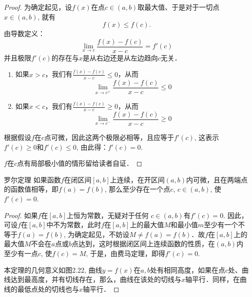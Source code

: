 \begin{proof}
    为确定起见，设$f(x)$在点$c\in (a,b)$取最大值、于是对于一切点$x\in (a,b)$, 就有
\[
f (x) \le f (c). 
\]
由导数定义：
\[\lim_{x\to c}\frac{f (x) -f (c)}{x-c} =f' (c) \]
并且极限$f'(c)$的存在与$x$是从右边还是从左边趋向$c$无关．

\begin{enumerate}
    \item 如果$x>c$，我们有$\frac{f (x) -f (c)}{x-c}\le 0$，从而
\[\lim_{x\to c^+}\frac{f (x) -f (c)}{x-c}\le 0\]
\item 如果$x<c$，我们有$\frac{f (x) -f (c)}{x-c}\ge 0$，从而
\[\lim_{x\to c^-}\frac{f (x) -f (c)}{x-c}\ge 0\]
\end{enumerate}
根据假设$f$在$c$点可微，因此这两个极限必相等，且应等于$f'(c)$, 这表示$f'(c)\ge 0$和$f'(c)\le 0$, 由此得：$f' (c) =0$.

$f$在$c$点有局部极小值的情形留给读者自证．
\end{proof}

\begin{blk}
  {罗尔定理} 如果函数$f$在闭区间$[a,b]$上连续，在开区间$(a,b)$内可微，且在两端点的函数值相等，即$f(a)=f(b)$, 那么至少存在一个点$c$, $c\in (a,b)$, 使$f'(c)=0$.  
\end{blk}

\begin{proof}
如果$f$在$[a,b]$上恒为常数，无疑对于任何
$c\in (a,b)$有$f'(c)=0$. 因此，可设$f$在$[a,b]$中不为常数，此时$f$在$[a,b]$上的最大值$M$和最小值$m$至少有一个不等于$f(a)=f(b)$, 为确定起见，不妨设$M\ne f(a)=f(b)$．故$f$在$[a,b]$上的最大值$M$不会在$a$点或$b$点达到，这时根据闭区间上连续函数的性质，在$(a,b)$内至少有一点$c$, 使$f(c)=M$, 于是，由费马定理，即得$f'(c)=0$. 

本定理的几何意义如图2.22, 曲线$y=f(x)$在$a,b$处有相同高度，如果在点$c$处、曲线达到最高度，并有切线存在，那么，曲线在该处的切线与$x$轴平行．同样，在曲线的最低点处的切线也与$x$轴平行．
\end{proof}

